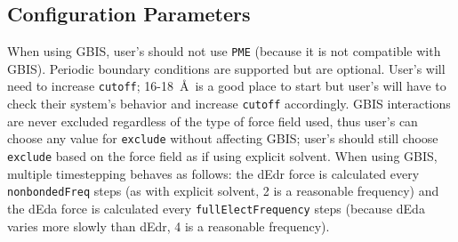 \subsection{Configuration Parameters}

When using GBIS, user's should not use {\tt PME} (because it is not compatible with GBIS).
Periodic boundary conditions are supported but are optional.
User's will need to increase {\tt cutoff}; 16-18~\AA~is a good place to start but user's will have to check their system's behavior and increase {\tt cutoff} accordingly.
GBIS interactions are never excluded regardless of the type of force field used, thus user's can choose any value for {\tt exclude} without affecting GBIS; user's should still choose {\tt exclude} based on the force field as if using explicit solvent.
When using GBIS, multiple timestepping behaves as follows:
the dEdr force is calculated every {\tt nonbondedFreq} steps (as with explicit solvent, 2 is a reasonable frequency) and
the dEda force is calculated every {\tt fullElectFrequency} steps (because dEda varies more slowly than dEdr, 4 is a reasonable frequency).

